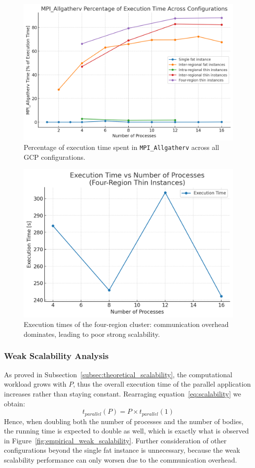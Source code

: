 \documentclass{article}
\begin{document}
\begin{figure}[H]
\centering
\includegraphics[width=0.8\linewidth]{communication_fraction_ex_time.png}
\caption{Percentage of execution time spent in \texttt{MPI\_Allgatherv} across all GCP configurations.}
\label{fig:comparison_fraction_communication}
\end{figure}

\begin{figure}[H]
\centering
\includegraphics[width=0.8\linewidth]{four_region_ex_time.png}
\caption{Execution times of the four-region cluster: communication overhead dominates, leading to poor strong scalability.}
\label{fig:four_region_ex_time}
\end{figure}

\subsubsection{Weak Scalability Analysis}
As proved in Subsection~\ref{subsec:theoretical_scalability}, the computational workload grows with $P$, thus the overall execution time of the parallel application increases rather than staying constant.
Rearraging equation~\ref{eq:scalability} we obtain:
\begin{equation}
t_{parallel}(P) = P\times t_{parallel}(1)
\end{equation}
Hence, when doubling both the number of processes and the number of bodies, the running time is expected to double as well, which is exactly what is observed in Figure~\ref{fig:empirical_weak_scalability}.
Further consideration of other configurations beyond the single fat instance is unnecessary, because the weak scalability performance can only worsen due to the communication overhead.
\end{document}
